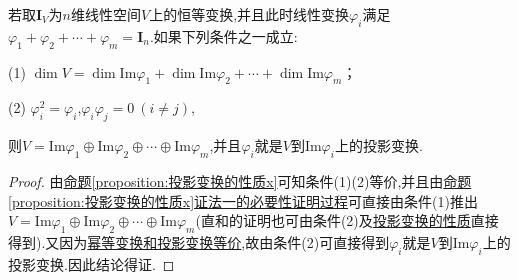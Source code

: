 \documentclass[../../main.tex]{subfiles}%
\begin{document}
\begin{corollary}\label{corollary:恒等变换的幂等分解}
若取\(\boldsymbol{I}_V\)为$n$维线性空间\(V\)上的恒等变换,并且此时线性变换\(\varphi_i\)满足\(\varphi_1+\varphi_2+\cdots+\varphi_m = \boldsymbol{I}_n\).如果下列条件之一成立:

(1) \(\dim V=\dim\text{Im}\varphi_1+\dim\text{Im}\varphi_2+\cdots+\dim\text{Im}\varphi_m\)；

(2) \(\varphi_i^2 = \varphi_i\),\(\varphi_i\varphi_j = 0\ (i\neq j)\),

则\(V = \text{Im}\varphi_1\oplus\text{Im}\varphi_2\oplus\cdots\oplus\text{Im}\varphi_m\),并且\(\varphi_i\)就是\(V\)到\(\text{Im}\varphi_i\)上的投影变换.
\end{corollary}
\begin{proof}

由\hyperref[proposition:投影变换的性质x]{命题\ref{proposition:投影变换的性质x}}可知条件(1)(2)等价,并且由\hyperref[proposition:投影变换的性质x]{命题\ref{proposition:投影变换的性质x}证法一的必要性证明过程}可直接由条件(1)推出\(V = \text{Im}\varphi_1\oplus\text{Im}\varphi_2\oplus\cdots\oplus\text{Im}\varphi_m\)(直和的证明也可由条件(2)及\hyperref[proposition:投影变换的性质]{投影变换的性质}直接得到).又因为\hyperlink{幂等变换和投影变换等价}{幂等变换和投影变换等价},故由条件(2)可直接得到\(\varphi_i\)就是\(V\)到\(\text{Im}\varphi_i\)上的投影变换.因此结论得证.

\end{proof}
\end{document}

